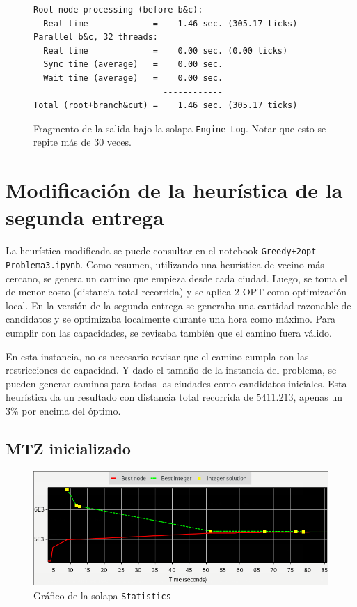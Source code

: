 \documentclass[titlepage,a4paper,oneside]{article}
\begin{document}
\begin{figure}[H]
\begin{verbatim}
Root node processing (before b&c):
  Real time             =    1.46 sec. (305.17 ticks)
Parallel b&c, 32 threads:
  Real time             =    0.00 sec. (0.00 ticks)
  Sync time (average)   =    0.00 sec.
  Wait time (average)   =    0.00 sec.
                          ------------
Total (root+branch&cut) =    1.46 sec. (305.17 ticks)
\end{verbatim}
\caption{Fragmento de la salida bajo la solapa \texttt{Engine Log}. Notar que esto se repite más de 30 veces.}
\end{figure}

\section{Modificación de la heurística de la segunda entrega}
La heurística modificada se puede consultar en el notebook \texttt{Greedy+2opt-Problema3.ipynb}. Como resumen, utilizando una heurística de vecino más cercano, se genera un camino que empieza desde cada ciudad. Luego, se toma el de menor costo (distancia total recorrida) y se aplica 2-OPT como optimización local. En la versión de la segunda entrega se generaba una cantidad razonable de candidatos y se optimizaba localmente durante una hora como máximo. Para cumplir con las capacidades, se revisaba también que el camino fuera válido.

En esta instancia, no es necesario revisar que el camino cumpla con las restricciones de capacidad. Y dado el tamaño de la instancia del problema, se pueden generar caminos para todas las ciudades como candidatos iniciales. Esta heurística da un resultado con distancia total recorrida de $5411.213$, apenas un 3\% por encima del óptimo.

\subsection{MTZ inicializado}
\begin{figure}[H]
\centering
\includegraphics[width=\textwidth]{images/MTZ_init.png}
\caption{Gráfico de la solapa \texttt{Statistics}}
\end{figure}
\end{document}
